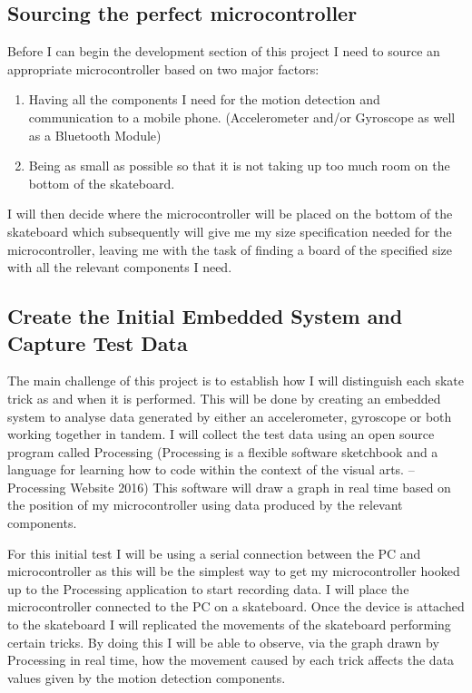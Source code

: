 \subsection{Sourcing the perfect microcontroller}\label{tor:sourcemicrocontroller}
Before I can begin the development section of this project I need to source an appropriate microcontroller based on two major factors: 
\begin{enumerate}
\item Having all the components I need for the motion detection and communication to a mobile phone. (Accelerometer and/or Gyroscope as well as a Bluetooth Module)
\item Being as small as possible so that it is not taking up too much room on the bottom of the skateboard. 
\end{enumerate}
I will then decide where the microcontroller will be placed on the bottom of the skateboard which subsequently will give me my size specification needed for the microcontroller, leaving me with the task of finding a board of the specified size with all the relevant components I need.

\subsection{Create the Initial Embedded System and Capture Test Data}\label{tor:esandtestdata}
The main challenge of this project is to establish how I will distinguish each skate trick as and when it is performed. This will be done by creating an embedded system to analyse data generated by either an accelerometer, gyroscope or both working together in tandem. I will collect the test data using an open source program called Processing (Processing is a flexible software sketchbook and a language for learning how to code within the context of the visual arts. – Processing Website 2016) This software will draw a graph in real time based on the position of my microcontroller using data produced by the relevant components. 

For this initial test I will be using a serial connection between the PC and microcontroller as this will be the simplest way to get my microcontroller hooked up to the Processing application to start recording data. I will place the microcontroller connected to the PC on a skateboard. Once the device is attached to the skateboard I will replicated the movements of the skateboard performing certain tricks. By doing this I will be able to observe, via the graph drawn by Processing in real time, how the movement caused by each trick affects the data values given by the motion detection components. 

